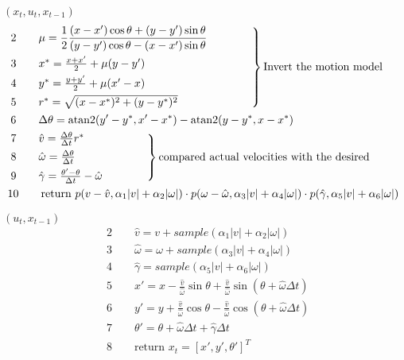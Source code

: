  $(x_t, u_t, x_{t-1})$
\begin{align*}
	& \begin{rcases} \displaystyle
		2 \qquad \mu = \frac{1}{2} \frac{(x-x')\cos\theta+(y-y')\sin\theta}{(y-y')\cos\theta-(x-x')\sin\theta} \qquad\qquad\\
		3 \qquad x^* = \frac{x+x'}{2} + \mu (y-y')\\
		4 \qquad y^* = \frac{y+y'}{2} + \mu (x'-x)\\
		5 \qquad r^* = \sqrt{(x-x^*)^2 + (y-y^*)^2}
	\end{rcases} \text{Invert the motion model}\\
	& \;6 \qquad \Delta \theta = \text{atan2}(y'-y^*, x'-x^*) - \text{atan2}(y-y^*, x-x^*)\\
	& \begin{rcases}
		7 \qquad\hat{v} = \frac{\Delta\theta}{\Delta t} r^*\\
		8 \qquad\hat{\omega} = \frac{\Delta\theta}{\Delta t}\\
		9 \qquad\hat{\gamma} = \frac{\theta' - \theta}{\Delta t} - \hat{\omega}
		\qquad\qquad
	\end{rcases} \text{compared actual velocities with the desired}\\
	& 10 \qquad \text{return } p(v-\hat{v}, \alpha_1|v| + \alpha_2|\omega|) 
	\cdot p(\omega-\hat{\omega}, \alpha_3|v| + \alpha_4|\omega|)
	\cdot p(\hat{\gamma}, \alpha_5|v| + \alpha_6|\omega|)
\end{align*}

 $(u_t, x_{t-1})$
\begin{align*}
	& 2 \qquad \hat{v} = v + sample(\alpha_1|v| + \alpha_2|\omega|) \\
	& 3 \qquad \hat{\omega} = \omega + sample(\alpha_3|v| + \alpha_4|\omega|) \\
	& 4 \qquad \hat{\gamma} = sample(\alpha_5|v| + \alpha_6|\omega|) \\
	& 5 \qquad x' = x - \frac{\hat{v}}{\hat{\omega}}\sin\theta + \frac{\hat{v}}{\hat{\omega}}\sin(\theta + \hat{\omega}\Delta t)\\
	& 6 \qquad y' = y + \frac{\hat{v}}{\hat{\omega}}\cos\theta - \frac{\hat{v}}{\hat{\omega}}\cos(\theta + \hat{\omega}\Delta t)\\
	& 7 \qquad \theta' = \theta + \hat{\omega} \Delta t + \hat{\gamma} \Delta t \\
	& 8 \qquad \text{return } x_t = [x', y', \theta']^T
\end{align*}

